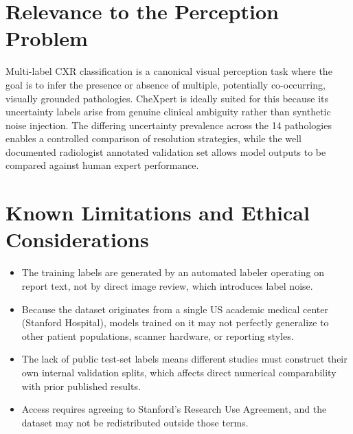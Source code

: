 \documentclass[conference]{IEEEtran}
\begin{document}
\begin{table}[htbp]
\centering
\caption{CheXpert Training-Set Label Distribution}
\label{tab:labeldist}
\end{table}

\section{Relevance to the Perception Problem}
Multi-label CXR classification is a canonical visual perception task where the goal is to infer the presence or absence of multiple, potentially co-occurring, visually grounded pathologies. CheXpert is ideally suited for this because its uncertainty labels arise from genuine clinical ambiguity rather than synthetic noise injection. The differing uncertainty prevalence across the 14 pathologies enables a controlled comparison of resolution strategies, while the well documented radiologist annotated validation set allows model outputs to be compared against human expert performance.

\newpage
\section{Known Limitations and Ethical Considerations}
\begin{itemize}
\item The training labels are generated by an automated labeler operating on report text, not by direct image review, which introduces label noise.
\item Because the dataset originates from a single US academic medical center (Stanford Hospital), models trained on it may not perfectly generalize to other patient populations, scanner hardware, or reporting styles.
\item The lack of public test-set labels means different studies must construct their own internal validation splits, which affects direct numerical comparability with prior published results.
\item Access requires agreeing to Stanford's Research Use Agreement, and the dataset may not be redistributed outside those terms.
\end{itemize}
\end{document}
